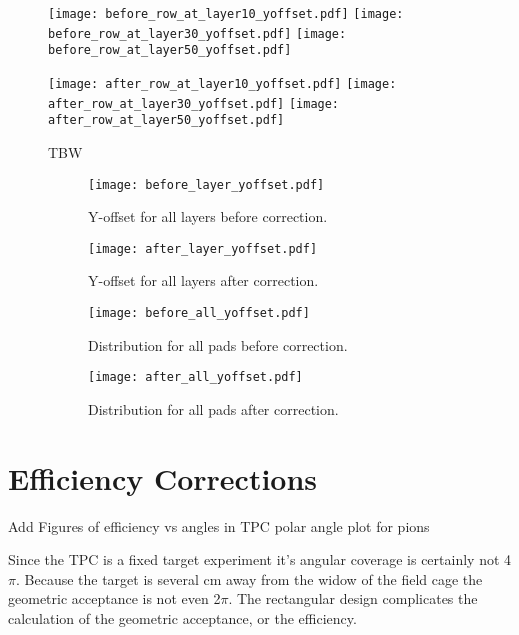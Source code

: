 \begin{figure}[!htb]
  \begin{center}
    \texttt{[image: before\_row\_at\_layer10\_yoffset.pdf]}
    \texttt{[image: before\_row\_at\_layer30\_yoffset.pdf]}
    \texttt{[image: before\_row\_at\_layer50\_yoffset.pdf]}
 
    \texttt{[image: after\_row\_at\_layer10\_yoffset.pdf]}
    \texttt{[image: after\_row\_at\_layer30\_yoffset.pdf]}
    \texttt{[image: after\_row\_at\_layer50\_yoffset.pdf]}
 
    \caption{TBW\label{TBD}}
  \end{center}
  \label{fig:coboCorr}
\end{figure}



\begin{figure}[!htb]
    \centering
    \begin{subfigure}[t]{0.49\textwidth}
        \centering
        \texttt{[image: before\_layer\_yoffset.pdf]}
        \caption{Y-offset for all layers before correction.} \label{fig:yoff_beforeLayer}
    \end{subfigure}
    \hfill
    \begin{subfigure}[t]{.49\textwidth}
        \centering
        \texttt{[image: after\_layer\_yoffset.pdf]} 
        \caption{Y-offset for all layers after correction.} \label{fig:yoff_afterLayer}
    \end{subfigure}
     \hfill
    \begin{subfigure}[t]{.49\textwidth}
        \centering
        \texttt{[image: before\_all\_yoffset.pdf]} 
        \caption{Distribution for all pads before correction.} \label{fig:yoff_allBefore}
    \end{subfigure}
    \hfill
    \begin{subfigure}[t]{.49\textwidth}
        \centering
        \texttt{[image: after\_all\_yoffset.pdf]} 
        \caption{Distribution for all pads after correction.} \label{fig:yoff_allAfter}
    \end{subfigure}
    \caption{ }
\label{fig:yoff}
\end{figure}



\section{Efficiency Corrections}
Add Figures of efficiency vs angles in TPC polar angle plot for pions


Since the \spirit TPC is a fixed target experiment it's angular coverage is certainly not 4$\pi$. Because the target is several cm away from the widow of the field cage the geometric acceptance is not even 2$\pi$. The rectangular design complicates the calculation of the geometric acceptance, or the efficiency.


